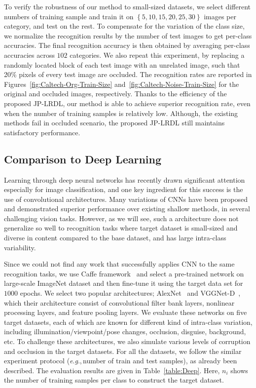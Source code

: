 \documentclass[journal]{IEEEtran}
\newcommand{\eg}{\textit{e}.\textit{g}.,\,}
\begin{document}
To verify the robustness of our method to small-sized datasets, we select different numbers of training sample and train it on $\left \{5, 10, 15, 20, 25, 30\right \}$ images per category, and test on the rest. To compensate for the variation of the class size, we normalize the recognition results by the number of test images to get per-class accuracies. The final recognition accuracy is then obtained by averaging per-class accuracies across $102$ categories. We also repeat this experiment, by replacing a randomly located block of each test image with an unrelated image, such that 20\% pixels of every test image are occluded. The recognition rates are reported in Figures~\ref{fig:Caltech-Org-Train-Size} and~\ref{fig:Caltech-Noise-Train-Size} for the original and occluded images, respectively. Thanks to the efficiency of the proposed JP-LRDL, our method is able to achieve superior recognition rate, even when the number of training samples is relatively low. Although, the existing methods fail in occluded scenario, the proposed JP-LRDL still maintains satisfactory performance.
\subsection{Comparison to Deep Learning}
Learning through deep neural networks has recently drawn significant attention especially for image classification, and one key ingredient for this success is the use of convolutional architectures. Many variations of CNNs have been proposed and demonstrated superior performance over existing shallow methods, in several challenging vision tasks. However, as we will see, such a architecture does not generalize so well to recognition tasks where target dataset is small-sized and diverse in content compared to the base dataset, and has large intra-class variability.

Since we could not find any work that successfully applies CNN to the same recognition tasks, we use Caffe framework~\cite{Caffe} and select a pre-trained network on large-scale ImageNet dataset and then fine-tune it using the target data set for $1000$ epochs. We select two popular architectures; AlexNet~\cite{Alex-Net} and VGGNet-D~\cite{VGG-Net}, which their architecture consist of convolutional filter bank layers, nonlinear processing layers, and feature pooling layers. We evaluate these networks on five target datasets, each of which are known for different kind of intra-class variation, including illumination/viewpoint/pose changes, occlusion, disguise, background, etc. To challenge these architectures, we also simulate various levels of corruption and occlusion in the target datasets. For all the datasets, we follow the similar experiment protocol (\eg number of train and test samples), as already been described. The evaluation results are given in Table~\ref{table:Deep}. Here, $n_i$ shows the number of training samples per class to construct the target dataset.
\end{document}
